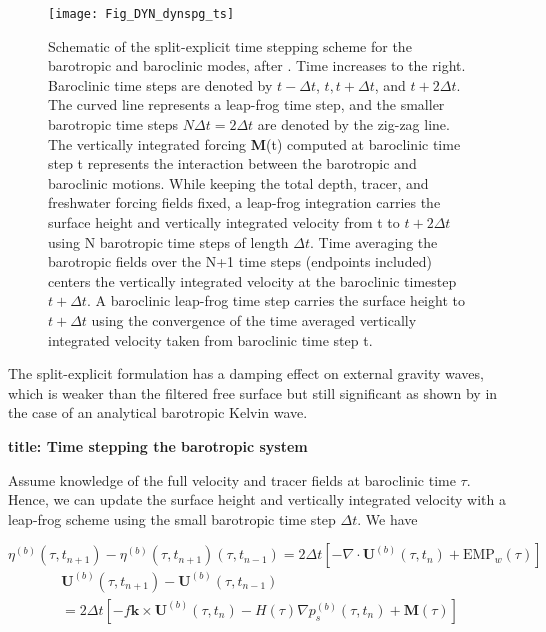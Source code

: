 \documentclass[NEMO_book]{subfiles}
\begin{document}
\begin{figure}[!t] 	\begin{center}
\texttt{[image: Fig\_DYN\_dynspg\_ts]}
\caption{	 \label{Fig_DYN_dynspg_ts}
Schematic of the split-explicit time stepping scheme for the barotropic and baroclinic modes, 
after \citet{Griffies2004}. Time increases to the right. Baroclinic time steps are denoted by 
$t-\Delta t$, $t, t+\Delta t$, and $t+2\Delta t$. The curved line represents a leap-frog time step, 
and the smaller barotropic time steps $N \Delta t=2\Delta t$ are denoted by the zig-zag line. 
The vertically integrated forcing \textbf{M}(t) computed at baroclinic time step t represents 
the interaction between the barotropic and baroclinic motions. While keeping the total depth, 
tracer, and freshwater forcing fields fixed, a leap-frog integration carries the surface height 
and vertically integrated velocity from t to $t+2 \Delta t$ using N barotropic time steps of length 
$\Delta t$. Time averaging the barotropic fields over the N+1 time steps (endpoints included) 
centers the vertically integrated velocity at the baroclinic timestep $t+\Delta t$. 
A baroclinic leap-frog time step carries the surface height to $t+\Delta t$ using the convergence 
of the time averaged vertically integrated velocity taken from baroclinic time step t. }
\end{center}
\end{figure}

The split-explicit formulation has a damping effect on external gravity waves, which is weaker than the filtered free surface but still significant as shown by \citet{Levier2007} in the case of an analytical barotropic Kelvin wave. 


\textbf{title: Time stepping the barotropic system }

Assume knowledge of the full velocity and tracer fields at baroclinic time $\tau$. Hence, 
we can update the surface height and vertically integrated velocity with a leap-frog 
scheme using the small barotropic time step $\Delta t$. We have 

\begin{equation} \label{DYN_spg_ts_eta}
\eta^{(b)}(\tau,t_{n+1}) - \eta^{(b)}(\tau,t_{n+1}) (\tau,t_{n-1})
	= 2 \Delta t \left[-\nabla \cdot \textbf{U}^{(b)}(\tau,t_n) + \text{EMP}_w(\tau) \right] 
\end{equation}
\begin{multline} \label{DYN_spg_ts_u}
\textbf{U}^{(b)}(\tau,t_{n+1}) - \textbf{U}^{(b)}(\tau,t_{n-1})  \\
	= 2\Delta t \left[ - f \textbf{k} \times \textbf{U}^{(b)}(\tau,t_{n}) 
	- H(\tau) \nabla p_s^{(b)}(\tau,t_{n}) +\textbf{M}(\tau) \right]
\end{multline}
\
\end{document}
